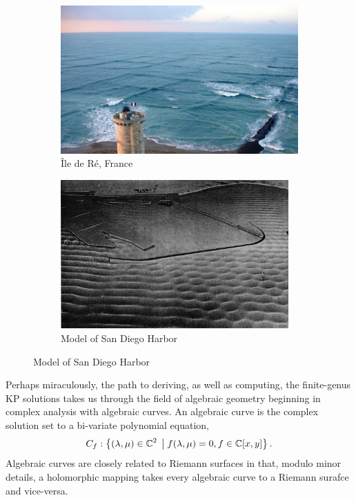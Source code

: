 \begin{figure}
  \centering
  \begin{subfigure}[b]{0.5\textwidth}
    \includegraphics[width=\textwidth]{images/livekp.jpg}
    \caption{\^{I}le de R\'{e}, France}
    \label{fig:ile-de-re}
  \end{subfigure}

  \begin{subfigure}[b]{0.5\textwidth}
    \centering
    \includegraphics[width=0.96\textwidth]{images/sd-harbor-model.jpg}
    \caption{Model of San Diego Harbor}
    \label{fig:san-diego-harbor}
  \end{subfigure}
  \label{fig:real-life}
\end{figure}

Perhaps miraculously, the path to deriving, as well as computing, the
finite-genus KP solutions takes us through the field of algebraic geometry
beginning in complex analysis with algebraic curves. An algebraic curve is the
complex solution set to a bi-variate polynomial equation,
\begin{equation}
  C_f: \left\{
    (\lambda, \mu) \in \operatorname{\mathbb{C}}^2
    \; \big| \;
    f(\lambda, \mu) = 0, f \in \operatorname{\mathbb{C}}[x,y]
  \right\}.
\end{equation}
Algebraic curves are closely related to Riemann surfaces in that, modulo minor
details, a holomorphic mapping takes every algebraic curve to a Riemann surafce
and vice-versa.

